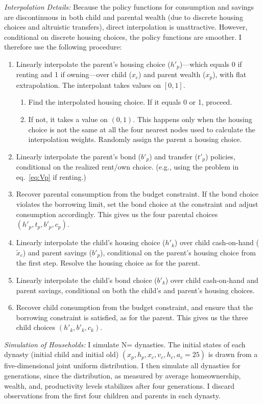 \documentclass[12pt]{article}
\begin{document}
\textit{Interpolation Details:} Because the policy functions for consumption and savings are discontinuous in both child and parental wealth (due to discrete housing choices and altruistic transfers), direct interpolation is unattractive. However, conditional on discrete housing choices, the policy functions are smoother. I therefore use the following procedure:
\begin{enumerate}
	\item Linearly interpolate the parent's housing choice ($h'_p$)---which equals 0 if renting and 1 if owning---over child ($x_c$) and parent wealth ($x_p$), with flat extrapolation. The interpolant takes values on $[0,1]$.
	\begin{enumerate}
		\item Find the interpolated housing choice. If it equals 0 or 1, proceed.
		\item If not, it takes a value on $(0,1)$. This happens only when the housing choice is not the same at all the four nearest nodes used to calculate the interpolation weights. Randomly assign the parent a housing choice.
	\end{enumerate}
	\item Linearly interpolate the parent's bond ($b'_p$) and transfer ($t'_p$) policies, conditional on the realized rent/own choice. (e.g., using the problem in eq.~\ref{eq:Vp} if renting.)
	\item Recover parental consumption from the budget constraint. If the bond choice violates the borrowing limit, set the bond choice at the constraint and adjust consumption accordingly. This gives us the four parental choices $(h'_p,t_p,b'_p,c_p)$.
	
	\item Linearly interpolate the child's housing choice ($h'_k$) over child cash-on-hand ($\tilde x_c$) and parent savings ($b'_p$), conditional on the parent's housing choice from the first step. Resolve the housing choice as for the parent.
	\item Linearly interpolate the child's bond choice ($b'_k$) over child cash-on-hand and parent savings, conditional on both the child's and parent's housing choices.
	\item Recover child consumption from the budget constraint, and ensure that the borrowing constraint is satisfied, as for the parent. This gives us the three child choices $(h'_k,b'_k,c_k)$. 
\end{enumerate}


\textit{Simulation of Households:} 
I simulate N={\parNdyn} dynasties. The initial states of each dynasty (initial child and initial old) $(x_p,h_p,x_c,v_c,h_c,a_c=25)$ is drawn from a five-dimensional joint uniform distribution. I then simulate all dynasties for {\parNdyn} generations, since the distribution, as measured by average homeownership, wealth, and, productivity levels stabilizes after four generations. I discard observations from the first four children and parents in each dynasty.
\end{document}

